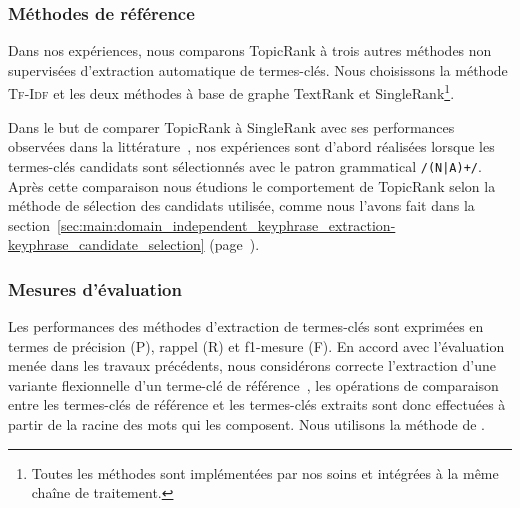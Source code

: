       \subsubsection{Méthodes de référence}
      \label{subsubsec:main:domain_independent_keyphrase_extraction-unsupervised_automatic_keyphrase_extraction-evaluation-baselines}
        Dans nos expériences, nous comparons TopicRank à trois autres
        méthodes non supervisées d'extraction automatique de termes-clés. Nous
        choisissons la méthode \textsc{Tf-Idf} et les deux méthodes à base de
        graphe TextRank et SingleRank\footnote{Toutes les méthodes sont
        implémentées par nos soins et intégrées à la même chaîne de
        traitement.}.
        
        Dans le but de comparer TopicRank à SingleRank avec ses performances
        observées dans la littérature~\cite{hassan2010conundrums}, nos
        expériences sont d'abord réalisées lorsque les termes-clés candidats
        sont sélectionnés avec le patron grammatical \texttt{/(N|A)+/}. Après
        cette comparaison nous étudions le comportement de TopicRank selon la
        méthode de sélection des candidats utilisée, comme nous l'avons fait
        dans la
        section~\ref{sec:main:domain_independent_keyphrase_extraction-keyphrase_candidate_selection}
        (page~\pageref{sec:main:domain_independent_keyphrase_extraction-keyphrase_candidate_selection}).

      \subsubsection{Mesures d'évaluation}
      \label{subsubsec:main:domain_independent_keyphrase_extraction-unsupervised_automatic_keyphrase_extraction-evaluation-evaluation_measures}
        Les performances des méthodes d'extraction de termes-clés sont exprimées
        en termes de précision (P), rappel (R) et f1-mesure (F). En
        accord avec l'évaluation menée dans les \mbox{travaux} précédents, nous
        considérons correcte l'extraction d'une variante flexionnelle d'un
        terme-clé de référence~\cite{kim2010semeval}, les opérations de
        comparaison entre les termes-clés de référence et les termes-clés
        extraits sont donc effectuées à partir de la racine des mots qui les
        composent. Nous utilisons la méthode de
        .


